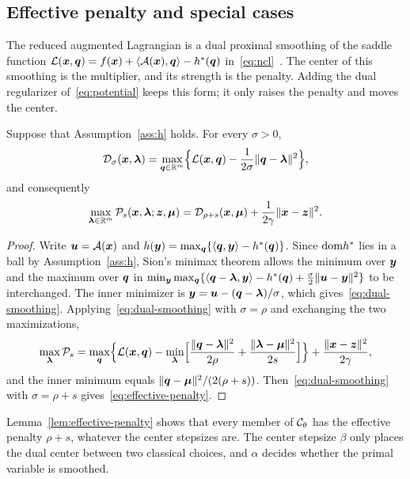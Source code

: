 \subsection{Effective penalty and special cases}
\label{subsec:effective-penalty}

The reduced augmented Lagrangian is a dual proximal smoothing of the saddle
function \(\mathcal{L}(\bm{x},\bm{q})=f(\bm{x})+\langle\mathcal{A}(\bm{x}),\bm{q}\rangle-h^*(\bm{q})\)
in~\eqref{eq:ncl}~\cite{rockafellar1976augmented}. The center of this
smoothing is the multiplier, and its strength is the penalty. Adding the dual
regularizer of~\eqref{eq:potential} keeps this form; it only raises the
penalty and moves the center.

\begin{lemma}
\label{lem:effective-penalty}
Suppose that Assumption~\ref{ass:h} holds. For every \(\sigma>0\),
\begin{equation}
    \mathcal{D}_\sigma(\bm{x},\bm{\lambda})
    =\max_{\bm{q}\in\mathbb{R}^m}\Bigl\{\mathcal{L}(\bm{x},\bm{q})-\frac{1}{2\sigma}\|\bm{q}-\bm{\lambda}\|^2\Bigr\},
    \label{eq:dual-smoothing}
\end{equation}
and consequently
\begin{equation}
    \max_{\bm{\lambda}\in\mathbb{R}^m}\mathcal P_s(\bm{x},\bm{\lambda};\bm{z},\bm{\mu})
    =\mathcal{D}_{\rho+s}(\bm{x},\bm{\mu})+\frac{1}{2\gamma}\|\bm{x}-\bm{z}\|^2 .
    \label{eq:effective-penalty}
\end{equation}
\end{lemma}

\begin{proof}
Write \(\bm{u}=\mathcal{A}(\bm{x})\) and \(h(\bm{y})=\max_{\bm{q}}\{\langle\bm{q},\bm{y}\rangle-h^*(\bm{q})\}\).
Since \(\mathrm{dom} h^*\) lies in a ball by Assumption~\ref{ass:h}, Sion's minimax
theorem allows the minimum over \(\bm{y}\) and the maximum over \(\bm{q}\) in
\(\min_{\bm{y}}\max_{\bm{q}}\{\langle\bm{q}-\bm{\lambda},\bm{y}\rangle-h^*(\bm{q})
+\frac{\sigma}{2}\|\bm{u}-\bm{y}\|^2\}\) to be interchanged. The inner minimizer is
\(\bm{y}=\bm{u}-(\bm{q}-\bm{\lambda})/\sigma\), which gives~\eqref{eq:dual-smoothing}.
Applying~\eqref{eq:dual-smoothing} with \(\sigma=\rho\) and exchanging the two
maximizations,
\[
    \max_{\bm{\lambda}}\mathcal P_s
    =\max_{\bm{q}}\Bigl\{\mathcal{L}(\bm{x},\bm{q})-\min_{\bm{\lambda}}\Bigl[\frac{\|\bm{q}-\bm{\lambda}\|^2}{2\rho}
    +\frac{\|\bm{\lambda}-\bm{\mu}\|^2}{2s}\Bigr]\Bigr\}+\frac{\|\bm{x}-\bm{z}\|^2}{2\gamma},
\]
and the inner minimum equals \(\|\bm{q}-\bm{\mu}\|^2/(2(\rho+s))\).
Then~\eqref{eq:dual-smoothing} with \(\sigma=\rho+s\)
gives~\eqref{eq:effective-penalty}.
\end{proof}

Lemma~\ref{lem:effective-penalty} shows that every member of
\(\mathcal{C}_\theta\) has the effective penalty \(\rho+s\), whatever the center
stepsizes are. The center stepsize \(\beta\) only places the dual center
between two classical choices, and \(\alpha\) decides whether the primal
variable is smoothed.

